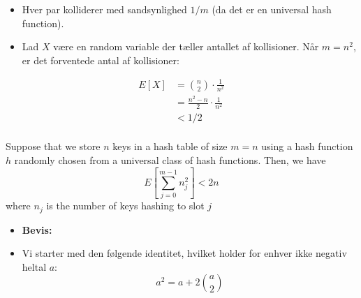 \documentclass{beamer}
\begin{document}
\begin{frame}[allowframebreaks]
\begin{itemize}
  \item Hver par kolliderer med sandsynlighed $1/m$ (da det er en universal hash function). 
  \item Lad $X$ være en random variable der tæller antallet af kollisioner. Når $m = n^{2}$, er det forventede antal af kollisioner:
  \end{itemize}
\begin{equation}
  \begin{split}
    E[X] &= \binom{n}{2} \cdot \frac{1}{n^{2}} \\
         &= \frac{n^{2}-n}{2} \cdot \frac{1}{n^{2}}\\
         &< 1/2\\
  \end{split}
\end{equation}
\begin{theorem}[11.10]
  Suppose that we store $n$ keys in a hash table of size $m = n$ using a hash function $h$ randomly chosen from a universal class of hash functions. Then, we have
  \[E \left[ \sum_{j=0}^{m-1}n^{2}_{j} \right] < 2n\]
  where $n_{j}$ is the number of keys hashing to slot $j$
\end{theorem}
\begin{itemize}
\item \textbf{Bevis:}
\item Vi starter med den følgende identitet, hvilket holder for enhver ikke negativ heltal $a$:
  \[ a^{2} = a + 2 \binom{a}{2} \]
\end{itemize}
\end{frame}
\end{document}
